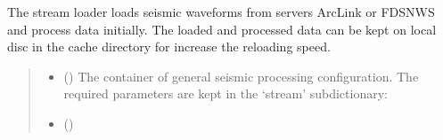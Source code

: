 \documentclass[letterpaper,10pt,english]{sphinxmanual}
\begin{document}
\begin{fulllineitems}
\label{\detokenize{api_core:amw.core.signal_utils.SignalException}}
\pysigstartsignatures
{}
\pysigstopsignatures
\end{fulllineitems}


\begin{fulllineitems}
\label{\detokenize{api_core:amw.core.signal_utils.StreamLoader}}
\pysigstartsignatures
{}
\pysigstopsignatures
\sphinxAtStartPar
The stream loader loads seismic waveforms from servers ArcLink or FDSNWS
and process data initially. The loaded and processed data can be kept on local disc
in the cache directory for increase the reloading speed.
\begin{quote}\begin{description}
\begin{itemize}
\item {} 
\sphinxAtStartPar
{} () \textendash{} The container of general seismic processing configuration.
The required parameters are kept in the ‘stream’ sub\sphinxhyphen{}dictionary:

\item {} 
\sphinxAtStartPar
{} ({\hyperref[\detokenize{api_core:amw.core.signal_utils.StreamPreprocessing}]{}})

\end{itemize}

\end{description}\end{quote}


\end{fulllineitems}
\end{document}
